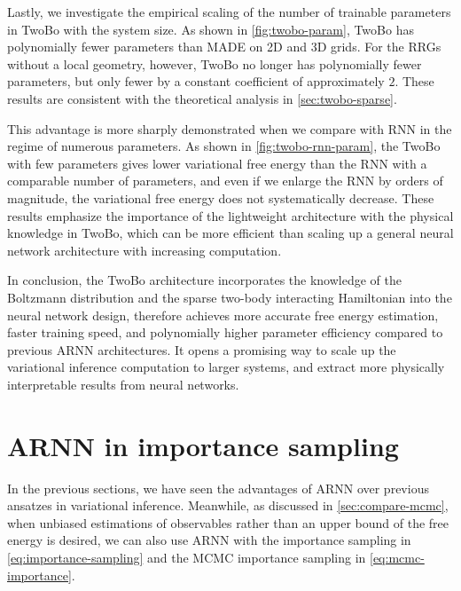 Lastly, we investigate the empirical scaling of the number of trainable parameters in TwoBo with the system size. As shown in \cref{fig:twobo-param}, TwoBo has polynomially fewer parameters than MADE on 2D and 3D grids. For the RRGs without a local geometry, however, TwoBo no longer has polynomially fewer parameters, but only fewer by a constant coefficient of approximately $2$. These results are consistent with the theoretical analysis in \cref{sec:twobo-sparse}.

This advantage is more sharply demonstrated when we compare with RNN in the regime of numerous parameters. As shown in \cref{fig:twobo-rnn-param}, the TwoBo with few parameters gives lower variational free energy than the RNN with a comparable number of parameters, and even if we enlarge the RNN by orders of magnitude, the variational free energy does not systematically decrease. These results emphasize the importance of the lightweight architecture with the physical knowledge in TwoBo, which can be more efficient than scaling up a general neural network architecture with increasing computation.

In conclusion, the TwoBo architecture incorporates the knowledge of the Boltzmann distribution and the sparse two-body interacting Hamiltonian into the neural network design, therefore achieves more accurate free energy estimation, faster training speed, and polynomially higher parameter efficiency compared to previous ARNN architectures. It opens a promising way to scale up the variational inference computation to larger systems, and extract more physically interpretable results from neural networks.

\section{ARNN in importance sampling}
\label{sec:arnn-mcmc}

In the previous sections, we have seen the advantages of ARNN over previous ansatzes in variational inference. Meanwhile, as discussed in \cref{sec:compare-mcmc}, when unbiased estimations of observables rather than an upper bound of the free energy is desired, we can also use ARNN with the importance sampling in \cref{eq:importance-sampling} and the MCMC importance sampling in \cref{eq:mcmc-importance}.

